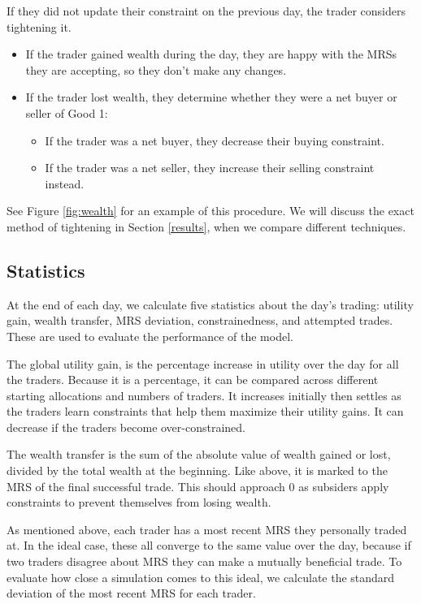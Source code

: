 \documentclass[12pt,a4paper,titlepage]{article}
\begin{document}
If they did not update their constraint on the previous day, the trader considers tightening it.
\begin{itemize}
  \item If the trader gained wealth during the day, they are happy with the MRSs they are accepting, so they don't make any changes.
  \item If the trader lost wealth, they determine whether they were a net buyer or seller of Good 1:
    \begin{itemize}
      \item If the trader was a net buyer, they decrease their buying constraint.
      \item If the trader was a net seller, they increase their selling constraint instead.
    \end{itemize}
\end{itemize}

See Figure \ref{fig:wealth} for an example of this procedure.
We will discuss the exact method of tightening in Section \ref{results}, when we compare different techniques.

\subsection{Statistics}
At the end of each day, we calculate five statistics about the day's trading: utility gain, wealth transfer, MRS deviation, constrainedness, and attempted trades.
These are used to evaluate the performance of the model.

The global utility gain, is the percentage increase in utility over the day for all the traders. 
Because it is a percentage, it can be compared across different starting allocations and numbers of traders.
It increases initially then settles as the traders learn constraints that help them maximize their utility gains.
It can decrease if the traders become over-constrained.

The wealth transfer is the sum of the absolute value of wealth gained or lost, divided by the total wealth at the beginning.
Like above, it is marked to the MRS of the final successful trade.
This should approach 0 as subsiders apply constraints to prevent themselves from losing wealth.

As mentioned above, each trader has a most recent MRS they personally traded at.
In the ideal case, these all converge to the same value over the day, because if two traders disagree about MRS they can make a mutually beneficial trade.
To evaluate how close a simulation comes to this ideal, we calculate the standard deviation of the most recent MRS for each trader.
\end{document}

